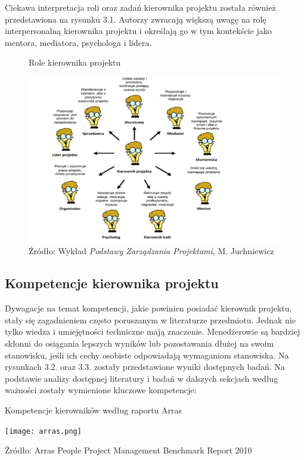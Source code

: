Ciekawa interpretacja roli oraz zadań kierownika projektu została również przedstawiona na rysunku 3.1. Autorzy zwracają większą uwagę na rolę interpersonalną kierownika projektu i określają go w tym kontekście jako mentora, mediatora, psychologa i lidera.
\begin{figure}
\caption{Role kierownika projektu}
\centering
\includegraphics[width=14cm]{img/rola.png}
\caption*{Źródło: Wykład \textit{Podstawy Zarządzania Projektami}, M. Juchniewicz}
\end{figure}

\subsection{Kompetencje kierownika projektu}
Dywagacje na temat kompetencji, jakie powinien posiadać kierownik projektu, stały się zagadnieniem często poruszanym w literaturze przedmiotu. Jednak nie tylko wiedza i umiejętności techniczne mają znaczenie. Menedżerowie są bardziej skłonni do osiągania lepszych wyników lub pozostawania dłużej na swoim stanowisku, jeśli ich cechy osobiste odpowiadają wymaganiom stanowiska.\autocite{MUMFORD200011}
Na rysunkach 3.2. oraz 3.3. zostały przedstawione wyniki dostępnych badań.
Na podstawie analizy dostępnej literatury i badań w dalszych sekcjach według ważności zostały wymienione kluczowe kompetencje: \autocite{analizaMulti} \autocite{Alvarenga} \autocite{arras2010} \autocite{ziek} \autocite{brill} \autocite{arras2015}

\begin{table}
    \caption{Kompetencje kierowników według raportu Arras}
    \centering
    \texttt{[image: arras.png]}
    \caption*{Źródło: Arras People Project Management Benchmark Report 2010 }
  \end{table}


